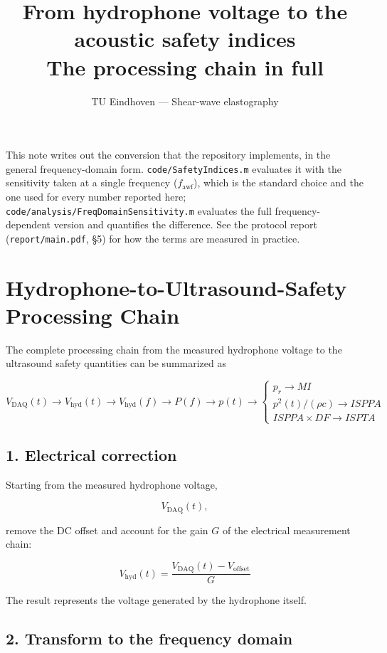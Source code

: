 \documentclass[11pt,a4paper]{article}
\title{\vspace{-1.5em}\textbf{From hydrophone voltage to the acoustic safety indices}\\[0.3em]
\large The processing chain in full}
\author{TU Eindhoven --- Shear-wave elastography}
\date{}
\begin{document}
\maketitle

\noindent
This note writes out the conversion that the repository implements, in the general
frequency-domain form. \texttt{code/SafetyIndices.m} evaluates it with the sensitivity taken at a
single frequency ($f_\mathrm{awf}$), which is the standard choice and the one used for every
number reported here; \texttt{code/analysis/FreqDomainSensitivity.m} evaluates the full
frequency-dependent version and quantifies the difference. See the protocol report
(\texttt{report/main.pdf}, \S5) for how the terms are measured in practice.

\bigskip
\section*{Hydrophone-to-Ultrasound-Safety Processing Chain}

The complete processing chain from the measured hydrophone voltage to the
ultrasound safety quantities can be summarized as

\[
\boxed{
V_{\mathrm{DAQ}}(t)
\rightarrow
V_{\mathrm{hyd}}(t)
\rightarrow
V_{\mathrm{hyd}}(f)
\rightarrow
P(f)
\rightarrow
p(t)
\rightarrow
\left\{
\begin{array}{l}
p_r \rightarrow MI\\[2mm]
p^2(t)/(\rho c) \rightarrow ISPPA\\[2mm]
ISPPA \times DF \rightarrow ISPTA
\end{array}
\right.
}
\]

\subsection*{1. Electrical correction}

Starting from the measured hydrophone voltage,

\[
V_{\mathrm{DAQ}}(t),
\]

remove the DC offset and account for the gain \(G\) of the electrical
measurement chain:

\[
\boxed{
V_{\mathrm{hyd}}(t)
=
\frac{V_{\mathrm{DAQ}}(t)-V_{\mathrm{offset}}}{G}
}
\]

The result represents the voltage generated by the hydrophone itself.

\subsection*{2. Transform to the frequency domain}
\end{document}

